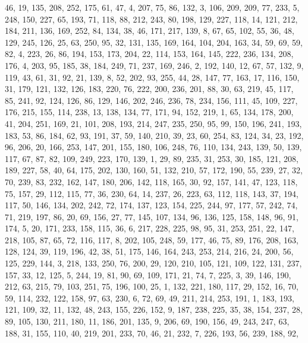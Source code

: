 \begin{DoxyCode}
       46, 19, 135, 208, 252, 175, 61, 47, 4, 207, 75, 86, 132, 3, 106, 209, 209, 77, 233, 5, 248, 150, 227, 65, 193,
       71, 118, 88, 212, 243, 80, 198, 129, 227, 118, 14, 121, 212, 184, 211, 136, 169, 252, 84, 134, 38, 46, 171,
       217, 139, 8, 67, 65, 102, 55, 36, 48, 129, 245, 126, 25, 63, 250, 95, 32, 131, 135, 169, 164, 104, 204,
       163, 34, 59, 69, 59, 82, 4, 223, 26, 86, 194, 153, 173, 204, 22, 114, 153, 164, 145, 222, 236, 134, 208, 176,
       4, 203, 95, 185, 38, 184, 249, 71, 237, 169, 246, 2, 192, 140, 12, 67, 57, 132, 9, 119, 43, 61, 31, 92, 21,
       139, 8, 52, 202, 93, 255, 44, 28, 147, 77, 163, 17, 116, 150, 31, 179, 121, 132, 126, 183, 220, 76, 222, 200,
       236, 201, 88, 30, 63, 219, 45, 117, 85, 241, 92, 124, 126, 86, 129, 146, 202, 246, 236, 78, 234, 156, 111,
       45, 109, 227, 176, 215, 155, 114, 238, 13, 138, 134, 77, 171, 94, 152, 219, 1, 65, 134, 178, 200, 41, 204,
       251, 169, 21, 101, 208, 193, 214, 247, 235, 250, 95, 99, 150, 196, 241, 193, 183, 53, 86, 184, 62, 93, 191,
       37, 59, 140, 210, 39, 23, 60, 254, 83, 124, 34, 23, 192, 96, 206, 20, 166, 253, 147, 201, 155, 180, 106, 248,
       76, 110, 134, 243, 139, 50, 139, 117, 67, 87, 82, 109, 249, 223, 170, 139, 1, 29, 89, 235, 31, 253, 30,
       185, 121, 208, 189, 227, 58, 40, 64, 175, 202, 130, 160, 51, 132, 210, 57, 172, 190, 55, 239, 27, 32, 70, 239,
       83, 232, 162, 147, 180, 206, 142, 118, 165, 30, 92, 157, 141, 47, 123, 118, 75, 157, 29, 112, 115, 77, 36,
       230, 64, 14, 237, 26, 223, 63, 112, 118, 143, 37, 194, 117, 50, 146, 134, 202, 242, 72, 174, 137, 123, 154,
       225, 244, 97, 177, 57, 242, 74, 71, 219, 197, 86, 20, 69, 156, 27, 77, 145, 107, 134, 96, 136, 125, 158, 148,
       96, 91, 174, 5, 20, 171, 233, 158, 115, 36, 6, 217, 228, 225, 98, 95, 31, 253, 251, 22, 147, 218, 105, 87,
       65, 72, 116, 117, 8, 202, 105, 248, 59, 177, 46, 75, 89, 176, 208, 163, 128, 124, 39, 119, 196, 42, 38, 51,
       175, 146, 164, 243, 253, 214, 216, 24, 200, 56, 125, 229, 144, 3, 218, 133, 250, 76, 200, 29, 120, 210, 105,
       121, 109, 122, 131, 237, 157, 33, 12, 125, 5, 244, 19, 81, 90, 69, 109, 171, 21, 74, 7, 225, 3, 39, 146,
       190, 212, 63, 215, 79, 103, 251, 75, 196, 100, 25, 1, 132, 221, 180, 117, 29, 152, 16, 70, 59, 114, 232, 122,
       158, 97, 63, 230, 6, 72, 69, 49, 211, 214, 253, 191, 1, 183, 193, 121, 109, 32, 11, 132, 48, 243, 155, 226,
       152, 9, 187, 238, 225, 35, 38, 154, 237, 28, 89, 105, 130, 211, 180, 11, 186, 201, 135, 9, 206, 69, 190,
       156, 49, 243, 247, 63, 188, 31, 155, 110, 40, 219, 201, 233, 70, 46, 21, 232, 7, 226, 193, 56, 239, 188, 92,

\end{DoxyCode}
